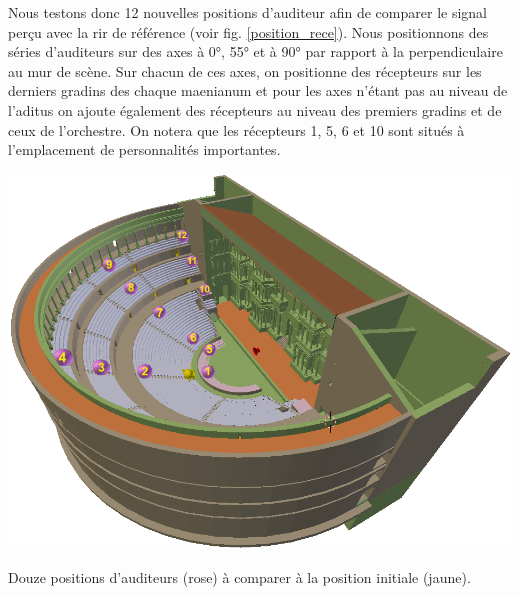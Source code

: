 Nous testons donc 12 nouvelles positions d'auditeur afin de comparer le signal perçu avec la \gls{rir} de référence (voir fig. \ref{position_rece}). Nous positionnons des séries d'auditeurs sur des axes à 0°, 55° et à 90° par rapport à la perpendiculaire au mur de scène. Sur chacun de ces axes, on positionne des récepteurs sur les derniers gradins des chaque \gls{maenianum} et pour les axes n'étant pas au niveau de l'\gls{aditus} on ajoute également des récepteurs au niveau des premiers gradins et de ceux de l'orchestre. On notera que les récepteurs 1, 5, 6 et 10 sont situés à l'emplacement de personnalités importantes.
\begin{figureth}
	\includegraphics[width=\linewidth]{images/position_rece}
	\caption{Douze positions d'auditeurs (rose) à comparer à la position initiale (jaune).}
	\label{position_rece}
\end{figureth}
%
